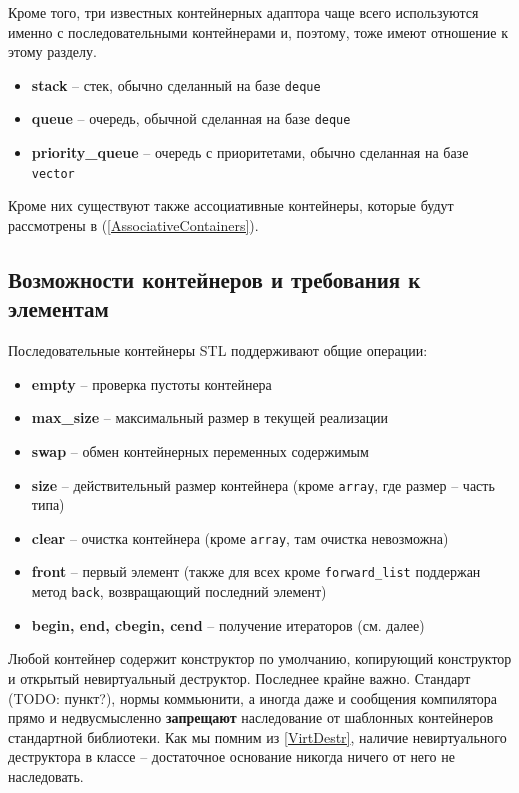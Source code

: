 \documentclass[a4paper,12pt,oneside]{book}
\begin{document}
Кроме того, три известных контейнерных адаптора чаще всего используются именно с последовательными контейнерами и, поэтому, тоже имеют отношение к этому разделу.

\begin{itemize}
\item \textbf{stack} -- стек, обычно сделанный на базе \lstinline!deque!
\item \textbf{queue} -- очередь, обычной сделанная на базе \lstinline!deque!
\item \textbf{priority\_queue} -- очередь с приоритетами, обычно сделанная на базе \lstinline!vector!
\end{itemize}

Кроме них существуют также ассоциативные контейнеры, которые будут рассмотрены в (\ref{AssociativeContainers}).

\subsection{Возможности контейнеров и требования к элементам}\label{StandardOperations}

Последовательные контейнеры STL поддерживают общие операции: 

\begin{itemize}
\item \textbf{empty} -- проверка пустоты контейнера
\item \textbf{max\_size} -- максимальный размер в текущей реализации
\item \textbf{swap} -- обмен контейнерных переменных содержимым
\item \textbf{size} -- действительный размер контейнера (кроме \lstinline!array!, где размер -- часть типа)
\item \textbf{clear} -- очистка контейнера (кроме \lstinline!array!, там очистка невозможна)
\item \textbf{front} -- первый элемент (также для всех кроме \lstinline!forward_list! поддержан метод \lstinline!back!, возвращающий последний элемент)
\item \textbf{begin, end, cbegin, cend} -- получение итераторов (см. далее)
\end{itemize}

Любой контейнер содержит конструктор по умолчанию, копирующий конструктор и открытый невиртуальный деструктор. Последнее крайне важно. Стандарт (TODO: пункт?), нормы коммьюнити, а иногда даже и сообщения компилятора прямо и недвусмысленно \textbf{запрещают} наследование от шаблонных контейнеров стандартной библиотеки. Как мы помним из \ref{VirtDestr}, наличие невиртуального деструктора в классе -- достаточное основание никогда ничего от него не наследовать.
\end{document}
